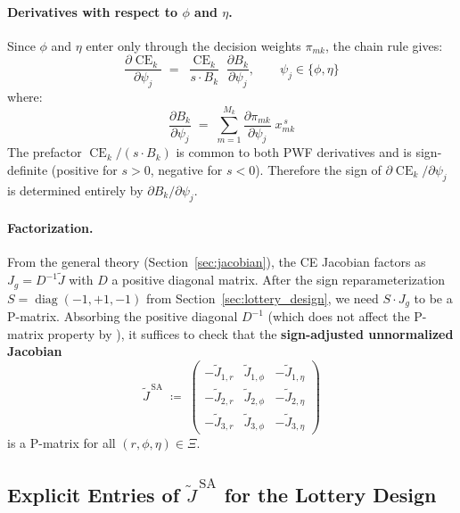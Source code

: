 \documentclass[11pt,a4paper]{article}
\theoremstyle{definition}
\DeclareMathOperator{\CE}{CE}
\DeclareMathOperator{\diag}{diag}
\begin{document}
\paragraph{Derivatives with respect to $\phi$ and $\eta$.}
Since $\phi$ and $\eta$ enter only through the decision weights
$\pi_{mk}$, the chain rule gives:
\begin{equation}
    \label{eq:dCE_dpsi}
    \frac{\partial \CE_k}{\partial \psi_j}
    \;=\; \frac{\CE_k}{s \cdot B_k}
    \;\frac{\partial B_k}{\partial \psi_j},
    \qquad \psi_j \in \{\phi, \eta\}
\end{equation}
where:
\begin{equation}
    \label{eq:dB_dpsi}
    \frac{\partial B_k}{\partial \psi_j}
    \;=\; \sum_{m=1}^{M_k}
    \frac{\partial \pi_{mk}}{\partial \psi_j}\; x_{mk}^{\,s}
\end{equation}
The prefactor $\CE_k / (s \cdot B_k)$ is common to both PWF derivatives
and is sign-definite (positive for $s > 0$, negative for $s < 0$).
Therefore the sign of $\partial\CE_k/\partial\psi_j$ is determined
entirely by $\partial B_k / \partial \psi_j$.

\paragraph{Factorization.}
From the general theory (Section~\ref{sec:jacobian}), the CE Jacobian
factors as $J_g = D^{-1}\widetilde{J}$ with $D$ a positive diagonal
matrix. After the sign reparameterization $S = \diag(-1, +1, -1)$
from Section~\ref{sec:lottery_design}, we need $S \cdot J_g$ to be a
P-matrix. Absorbing the positive diagonal $D^{-1}$ (which does not
affect the P-matrix property by ), it suffices
to check that the \textbf{sign-adjusted unnormalized Jacobian}
\begin{equation}
    \label{eq:Jtilde_SA}
    \widetilde{J}^{\,\mathrm{SA}}
    \;\coloneqq\;
    \begin{pmatrix}
        -\widetilde{J}_{1,r}  & \widetilde{J}_{1,\phi}  & -\widetilde{J}_{1,\eta} \\[3pt]
        -\widetilde{J}_{2,r}  & \widetilde{J}_{2,\phi}  & -\widetilde{J}_{2,\eta} \\[3pt]
        -\widetilde{J}_{3,r}  & \widetilde{J}_{3,\phi}  & -\widetilde{J}_{3,\eta}
    \end{pmatrix}
\end{equation}
is a P-matrix for all $(r, \phi, \eta) \in \Xi$.

\subsection{Explicit Entries of $\widetilde{J}^{\,\mathrm{SA}}$ for the Lottery Design}
\end{document}
